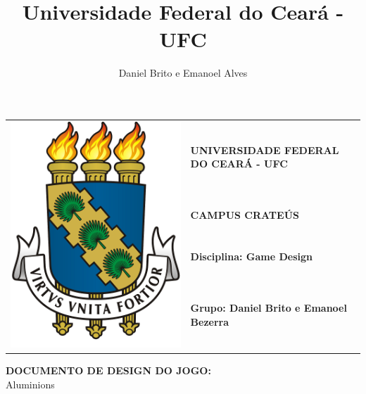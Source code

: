 \documentclass[]{scrartcl}
\title{Universidade Federal do Ceará - UFC}
\author{Daniel Brito e Emanoel Alves}
\date{}
\begin{document}
\begin{tabular}{ll}
\multirow{4}{*}{\includegraphics[scale=0.08]{figs/brasao}} &  \noindent\textbf{UNIVERSIDADE FEDERAL DO CEARÁ - UFC}\\ 
	& \noindent\textbf{CAMPUS CRATEÚS} \\ 
	& \noindent\textbf{Disciplina: Game Design} \\ 
	& \noindent\textbf{Grupo: Daniel Brito e Emanoel Bezerra} \\ 
\end{tabular} 
\vspace{1ex}
 \begin{center}
 	 {\Large \noindent\textbf{DOCUMENTO DE DESIGN DO JOGO:}}\\
 	 {Aluminions}
 \end{center}
 
\vspace{1ex}

\tableofcontents
\end{document}
